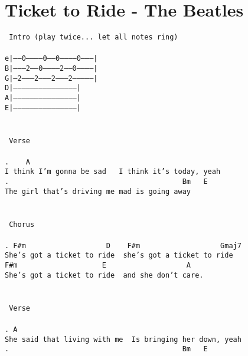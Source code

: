 \newpage
\section{Ticket to Ride - The Beatles}
\label{Ticket to Ride - The Beatles}
\texttt{\lbrack\ Intro\rbrack\ (play\ twice...\ let\ all\ notes\ ring)\\
\\
e|-----0-----------0-----0-----------0--------|\\
B|--------2-----0-----------2-----0-----------|\\
G|--2--------2--------2--------2--------------|\\
D|--------------------------------------------|\\
A|--------------------------------------------|\\
E|--------------------------------------------|\\
\\
\\
\lbrack\ Verse\rbrack\\
\\
.\ \ \ \ A\\
I\ think\ I'm\ gonna\ be\ sad\ \ \ I\ think\ it's\ today,\ yeah\\
.\ \ \ \ \ \ \ \ \ \ \ \ \ \ \ \ \ \ \ \ \ \ \ \ \ \ \ \ \ \ \ \ \ \ \ \ \ \ \ \ \ Bm\ \ \ E\\
The\ girl\ that's\ driving\ me\ mad\ is\ going\ away\\
\\
\\
\lbrack\ Chorus\rbrack\\
\\
.\ F\#m\ \ \ \ \ \ \ \ \ \ \ \ \ \ \ \ \ \ \ D\ \ \ \ F\#m\ \ \ \ \ \ \ \ \ \ \ \ \ \ \ \ \ \ \ Gmaj7\\
She's\ got\ a\ ticket\ to\ ride\ \ she's\ got\ a\ ticket\ to\ ride\\
F\#m\ \ \ \ \ \ \ \ \ \ \ \ \ \ \ \ \ \ \ \ E\ \ \ \ \ \ \ \ \ \ \ \ \ \ \ \ \ \ \ A\\
She's\ got\ a\ ticket\ to\ ride\ \ and\ she\ don't\ care.\\
\\
\\
\lbrack\ Verse\rbrack\\
\\
.\ A\\
She\ said\ that\ living\ with\ me\ \ Is\ bringing\ her\ down,\ yeah\\
.\ \ \ \ \ \ \ \ \ \ \ \ \ \ \ \ \ \ \ \ \ \ \ \ \ \ \ \ \ \ \ \ \ \ \ \ \ \ \ \ \ Bm\ \ \ E\\
}

